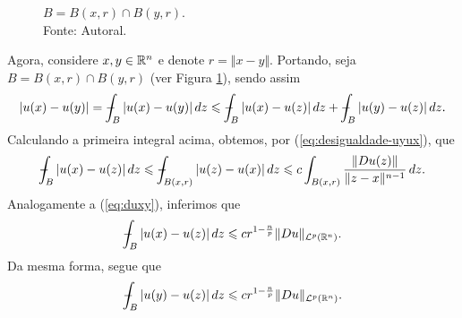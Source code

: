 \begin{prf}
    \begin{figure}
        \centering
        \caption{$B = B(x,r) \cap B(y,r)$.\\
        Fonte: Autoral.}
        \label{fig:B}
    \end{figure}
    Agora, considere $x, y \in \mathbb{R}^n$ e denote $r = \Vert x - y \Vert$. Portando, seja $B = B(x,r) \cap B(y,r)$ (ver Figura \ref{fig:B}), sendo assim
    \begin{equation} \label{eq:abcd}
        |u(x) - u(y)| = \sint_{B} |u(x) - u(y)| \,dz \leqslant \sint_{B} |u(x) - u(z)| \,dz + \sint_B |u(y) - u(z)| \,dz.
    \end{equation}
    Calculando a primeira integral acima, obtemos, por (\ref{eq:desigualdade-uyux}), que
    \[
        \sint_B |u(x) - u(z)| \,dz \leqslant \sint_{B(x,r)} |u(z) - u(x)| \,dz \leqslant c \int_{B(x,r)} \frac{\Vert Du(z) \Vert}{\Vert z - x \Vert^{n-1}} \,dz.
    \]
    Analogamente a (\ref{eq:duxy}), inferimos que
    \[
        -\!\!\!\!\!\!\int_B |u(x) - u(z)| \,dz \leqslant cr^{1 - \frac{n}{p}} \Vert Du \Vert_{\mathcal{L}^p(\mathbb{R}^n)}.
    \]
    Da mesma forma, segue que
    \[
        -\!\!\!\!\!\!\int_B |u(y) - u(z)| \,dz \leqslant cr^{1 - \frac{n}{p}} \Vert Du \Vert_{\mathcal{L}^p(\mathbb{R}^n)}.
    \]


\end{prf}
